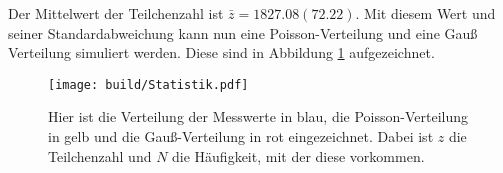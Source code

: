   

  Der Mittelwert der Teilchenzahl ist $\bar{z}=1827.08(72.22)$.
  Mit diesem Wert und seiner Standardabweichung kann nun eine Poisson-Verteilung und eine Gauß Verteilung simuliert werden.
  Diese sind in Abbildung \ref{fig:Statistik} aufgezeichnet.
  
  \begin{figure}[H]
    \texttt{[image: build/Statistik.pdf]}
    \caption{Hier ist die Verteilung der Messwerte in blau, die Poisson-Verteilung in gelb und die Gauß-Verteilung in rot eingezeichnet.
    Dabei ist $z$ die Teilchenzahl und $N$ die Häufigkeit, mit der diese vorkommen.}
    \label{fig:Statistik}
  \end{figure}




